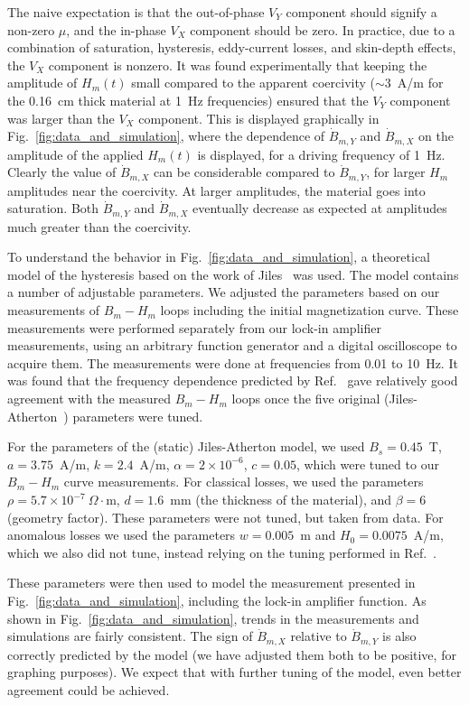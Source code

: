 The naive expectation is that the out-of-phase $V_Y$ component should
signify a non-zero $\mu$, and the in-phase $V_X$ component should be
zero.  In practice, due to a combination of saturation, hysteresis,
eddy-current losses, and skin-depth effects, the $V_X$ component is
nonzero.  It was found experimentally that keeping the amplitude of
$H_m(t)$ small compared to the apparent coercivity ($\sim 3$~A/m for
the 0.16~cm thick material at 1~Hz frequencies) ensured that the $V_Y$
component was larger than the $V_X$ component.  This is displayed
graphically in Fig.~\ref{fig:data_and_simulation}, where the
dependence of $\dot{B}_{m,Y}$ and $\dot{B}_{m,X}$ on the amplitude of
the applied $H_m(t)$ is displayed, for a driving frequency of 1~Hz.
Clearly the value of $\dot{B}_{m,X}$ can be considerable compared to
$\dot{B}_{m,Y}$, for larger $H_m$ amplitudes near the coercivity.  At
larger amplitudes, the material goes into saturation.  Both
$\dot{B}_{m,Y}$ and $\dot{B}_{m,X}$ eventually decrease as expected at
amplitudes much greater than the coercivity.

To understand the behavior in Fig.~\ref{fig:data_and_simulation}, a
theoretical model of the hysteresis based on the work of
Jiles~\cite{bib:jiles} was used.  The model contains a number of
adjustable parameters.  We adjusted the parameters based on our
measurements of $B_m-H_m$ loops including the initial magnetization
curve.  These measurements were performed separately from our lock-in
amplifier measurements, using an arbitrary function generator and a
digital oscilloscope to acquire them.  The measurements were done at
frequencies from 0.01 to 10~Hz.  It was found that the frequency
dependence predicted by Ref.~\cite{bib:jiles} gave relatively good
agreement with the measured $B_m-H_m$ loops once the five original
(Jiles-Atherton~\cite{bib:jiles-atherton}) parameters were tuned.

For the parameters of the (static) Jiles-Atherton model, we used
$B_s=0.45$~T, $a=3.75$~A/m, $k=2.4$~A/m, $\alpha=2\times 10^{-6}$,
$c=0.05$, which were tuned to our $B_m-H_m$ curve measurements.  For
classical losses, we used the parameters $\rho=5.7\times
10^{-7}~\Omega\cdot$m, $d=1.6$~mm (the thickness of the material), and
$\beta=6$ (geometry factor).  These parameters were not tuned, but
taken from data.  For anomalous losses we used the parameters
$w=0.005$~m and $H_0=0.0075$~A/m, which we also did not tune, instead
relying on the tuning performed in Ref.~\cite{bib:jiles}.

These parameters were then used to model the measurement presented in
Fig.~\ref{fig:data_and_simulation}, including the lock-in amplifier
function.  As shown in Fig.~\ref{fig:data_and_simulation}, trends in
the measurements and simulations are fairly consistent.  The sign of
$\dot{B}_{m,X}$ relative to $\dot{B}_{m,Y}$ is also correctly
predicted by the model (we have adjusted them both to be positive, for
graphing purposes).  We expect that with further tuning of the model,
even better agreement could be achieved.

